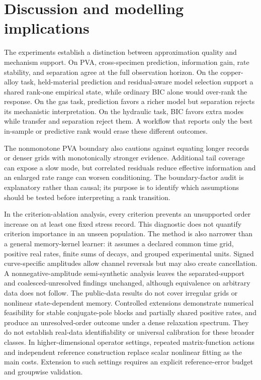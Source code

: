 \documentclass[11pt]{article}
\begin{document}
\section{Discussion and modelling implications}
The experiments establish a distinction between approximation quality and mechanism support. On PVA, cross-specimen prediction, information gain, rate stability, and separation agree at the full observation horizon. On the copper-alloy task, held-material prediction and residual-aware model selection support a shared rank-one empirical state, while ordinary BIC alone would over-rank the response. On the gas task, prediction favors a richer model but separation rejects its mechanistic interpretation. On the hydraulic task, BIC favors extra modes while transfer and separation reject them. A workflow that reports only the best in-sample or predictive rank would erase these different outcomes.

The nonmonotone PVA boundary also cautions against equating longer records or denser grids with monotonically stronger evidence. Additional tail coverage can expose a slow mode, but correlated residuals reduce effective information and an enlarged rate range can worsen conditioning. The boundary-factor audit is explanatory rather than causal; its purpose is to identify which assumptions should be tested before interpreting a rank transition.

In the criterion-ablation analysis, every criterion prevents an unsupported order increase on at least one fixed stress record. This diagnostic does not quantify criterion importance in an unseen population. The method is also narrower than a general memory-kernel learner: it assumes a declared common time grid, positive real rates, finite sums of decays, and grouped experimental units. Signed curve-specific amplitudes allow channel reversals but may also create cancellation. A nonnegative-amplitude semi-synthetic analysis leaves the separated-support and coalesced-unresolved findings unchanged, although equivalence on arbitrary data does not follow. The public-data results do not cover irregular grids or nonlinear state-dependent memory. Controlled extensions demonstrate numerical feasibility for stable conjugate-pole blocks and partially shared positive rates, and produce an unresolved-order outcome under a dense relaxation spectrum. They do not establish real-data identifiability or universal calibration for these broader classes. In higher-dimensional operator settings, repeated matrix-function actions and independent reference construction replace scalar nonlinear fitting as the main costs. Extension to such settings requires an explicit reference-error budget and groupwise validation.
\end{document}
